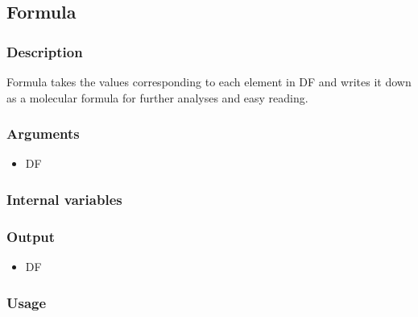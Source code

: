 \subsection{Formula}\label{Formula}
\subsubsection{Description}
Formula takes the values corresponding to each element in DF and writes it down as a molecular formula for further analyses and easy reading.
\subsubsection{Arguments}
\begin{itemize}
\item DF
\end{itemize}
\subsubsection{Internal variables}
\subsubsection{Output}
\begin{itemize}
\item DF
\end{itemize}
\subsubsection{Usage}

